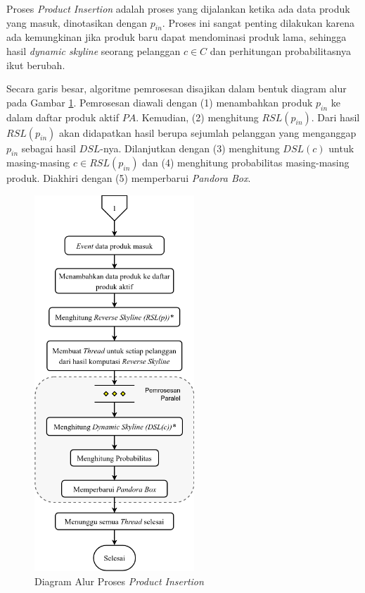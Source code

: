 
Proses \textit{Product Insertion} adalah proses yang dijalankan ketika ada data produk yang masuk, dinotasikan dengan $p_{in}$. Proses ini sangat penting dilakukan karena ada kemungkinan jika produk baru dapat mendominasi produk lama, sehingga hasil \textit{dynamic skyline} seorang pelanggan $c \in C$ dan perhitungan probabilitasnya ikut berubah. 

Secara garis besar, algoritme pemrosesan disajikan dalam bentuk diagram alur pada Gambar \ref{fig:flowchart-pi}. Pemrosesan diawali dengan (1) menambahkan produk $p_{in}$ ke dalam daftar produk aktif $PA$. Kemudian, (2) menghitung $RSL(p_{in})$. Dari hasil $RSL(p_{in})$ akan didapatkan hasil berupa sejumlah pelanggan yang menganggap $p_{in}$ sebagai hasil $DSL$-nya. Dilanjutkan dengan (3) menghitung $DSL(c)$ untuk masing-masing $c \in RSL(p_{in})$ dan (4) menghitung probabilitas masing-masing produk. Diakhiri dengan (5) memperbarui \textit{Pandora Box}. 

\begin{figure}[H]
	\centering
	\includegraphics[width=6cm]{assets/img/bab3/flowchart-pi.png}
	\caption{Diagram Alur Proses \textit{Product Insertion}}
	\label{fig:flowchart-pi}
\end{figure}

